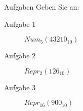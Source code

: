 \begin{frame}{Aufgaben}
	Geben Sie an:
	\begin{description}
		\item[Aufgabe 1] $Num_{5}(43210_{10})$
		\item[Aufgabe 2] $Repr_{2}(126_{10})$
		\item[Aufgabe 3] $Repr_{16}(900_{10})$
	\end{description}
\end{frame}
